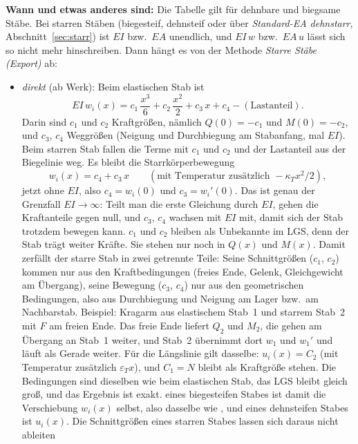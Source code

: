 \textbf{Wann  und  etwas anderes sind:} Die Tabelle gilt für dehnbare und
biegsame Stäbe. Bei starren Stäben (biegesteif, dehnsteif oder über \emph{Standard-EA dehnstarr},
Abschnitt~\ref{sec:starr}) ist $EI$ bzw.\ $EA$ unendlich, und $EI\,w$ bzw.\ $EA\,u$ lässt sich so
nicht mehr hinschreiben. Dann hängt es von der Methode \emph{Starre Stäbe (Export)} ab:

\begin{itemize}
  \item \emph{direkt} (ab Werk): Beim elastischen Stab ist
        \[
          EI\,w_i(x) = c_1\,\frac{x^3}{6} + c_2\,\frac{x^2}{2} + c_3\,x + c_4 - (\text{Lastanteil}) .
        \]
        Darin sind $c_1$ und $c_2$ Kraftgrößen, nämlich $Q(0) = -c_1$ und $M(0) = -c_2$, und
        $c_3$, $c_4$ Weggrößen (Neigung und Durchbiegung am Stabanfang, mal $EI$). Beim starren Stab
        fallen die Terme mit $c_1$ und $c_2$ und der Lastanteil aus der Biegelinie weg. Es bleibt die
        Starrkörperbewegung
        \[
          w_i(x) = c_4 + c_3\,x \qquad (\text{mit Temperatur zusätzlich } -\kappa_T x^2/2) ,
        \]
        jetzt ohne $EI$, also $c_4 = w_i(0)$ und $c_3 = w_i'(0)$. Das ist genau der Grenzfall
        $EI \to \infty$: Teilt man die erste Gleichung durch $EI$, gehen die Kraftanteile gegen null,
        und $c_3$, $c_4$ wachsen mit $EI$ mit, damit sich der Stab trotzdem bewegen kann.
        $c_1$ und $c_2$ bleiben als Unbekannte im LGS, denn der Stab trägt weiter Kräfte. Sie stehen
        nur noch in $Q(x)$ und $M(x)$. Damit zerfällt der starre Stab in zwei getrennte Teile: Seine
        Schnittgrößen ($c_1$, $c_2$) kommen nur aus den Kraftbedingungen (freies Ende, Gelenk,
        Gleichgewicht am Übergang), seine Bewegung ($c_3$, $c_4$) nur aus den geometrischen
        Bedingungen, also aus Durchbiegung und Neigung am Lager bzw.\ am Nachbarstab. Beispiel:
        Kragarm aus elastischem Stab~1 und starrem Stab~2 mit $F$ am freien Ende. Das freie Ende
        liefert $Q_2$ und $M_2$, die gehen am Übergang an Stab~1 weiter, und Stab~2 übernimmt dort
        $w_1$ und $w_1'$ und läuft als Gerade weiter. Für die Längslinie gilt dasselbe:
        $u_i(x) = C_2$ (mit Temperatur zusätzlich $\varepsilon_T x$), und $C_1 = N$ bleibt als
        Kraftgröße stehen. Die Bedingungen sind dieselben wie beim elastischen Stab, das LGS bleibt
        gleich groß, und das Ergebnis ist exakt.  eines biegesteifen Stabes ist damit die
        Verschiebung $w_i(x)$ selbst, also dasselbe wie , und  eines dehnsteifen
        Stabes ist $u_i(x)$. Die Schnittgrößen eines starren Stabes lassen sich daraus nicht ableiten

\end{itemize}
